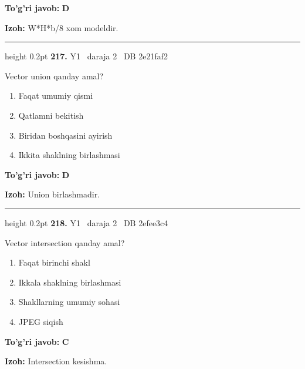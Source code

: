 \documentclass[10pt,a4paper,oneside]{article}
\begin{document}
\begin{tcolorbox}[enhanced,breakable,colback=teal!4,colframe=teal!45!black,boxrule=0.45pt,arc=1.2mm,left=2.8mm,right=2.8mm,top=2mm,bottom=2mm,before skip=2mm,after skip=2mm]
\textbf{\color{teal}To'g'ri javob:} \textbf{D}
\par\smallskip
\textbf{Izoh:} W*H*b/8 xom modeldir.
\end{tcolorbox}
\vspace{2mm}\hrule height 0.2pt \vspace{4mm}
\hypertarget{q217}{\textbf{\color{ink}217.}}  {\color{muted}\scriptsize Y1 \textbullet\ daraja 2 \textbullet\ DB 2e21faf2}
\par
Vector union qanday amal?
\begin{enumerate}[label=\Alph*),leftmargin=9mm]
\item Faqat umumiy qismi
\item Qatlamni bekitish
\item Biridan boshqasini ayirish
\item Ikkita shaklning birlashmasi
\end{enumerate}
\begin{tcolorbox}[enhanced,breakable,colback=teal!4,colframe=teal!45!black,boxrule=0.45pt,arc=1.2mm,left=2.8mm,right=2.8mm,top=2mm,bottom=2mm,before skip=2mm,after skip=2mm]
\textbf{\color{teal}To'g'ri javob:} \textbf{D}
\par\smallskip
\textbf{Izoh:} Union birlashmadir.
\end{tcolorbox}
\vspace{2mm}\hrule height 0.2pt \vspace{4mm}
\hypertarget{q218}{\textbf{\color{ink}218.}}  {\color{muted}\scriptsize Y1 \textbullet\ daraja 2 \textbullet\ DB 2efee3c4}
\par
Vector intersection qanday amal?
\begin{enumerate}[label=\Alph*),leftmargin=9mm]
\item Faqat birinchi shakl
\item Ikkala shaklning birlashmasi
\item Shakllarning umumiy sohasi
\item JPEG siqish
\end{enumerate}
\begin{tcolorbox}[enhanced,breakable,colback=teal!4,colframe=teal!45!black,boxrule=0.45pt,arc=1.2mm,left=2.8mm,right=2.8mm,top=2mm,bottom=2mm,before skip=2mm,after skip=2mm]
\textbf{\color{teal}To'g'ri javob:} \textbf{C}
\par\smallskip
\textbf{Izoh:} Intersection kesishma.
\end{tcolorbox}
\end{document}
